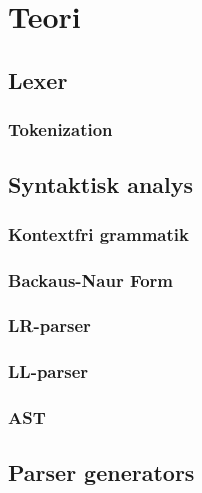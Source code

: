 \section{Teori}

\subsection{Lexer}
\subsubsection{Tokenization}

\subsection{Syntaktisk analys}

\subsubsection{Kontextfri grammatik}
\subsubsection{Backaus-Naur Form}
\subsubsection{LR-parser}
\subsubsection{LL-parser}
\subsubsection{AST}

\subsection{Parser generators}
